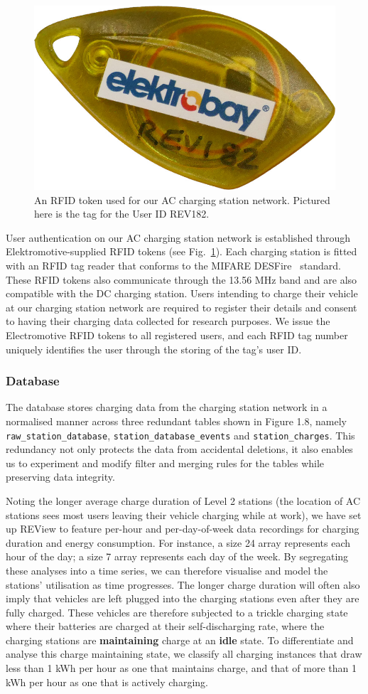 \begin{figure}[H]
	\centering
	\includegraphics[width=0.35\linewidth]{tag}
	\caption[An RFID token used for our AC charging station network]{An RFID token used for our AC charging station network. Pictured here is the tag for the User ID REV182.}
	\label{fig:9:actag}
\end{figure}

User authentication on our AC charging station network is established through Elektromotive-supplied RFID tokens (see Fig.~\ref{fig:9:actag}). Each charging station is fitted with an RFID tag reader that conforms to the MIFARE DESFire~\cite{nxp_semiconductors_mifare_nodate} standard. These RFID tokens also communicate through the 13.56 MHz band and are also compatible with the DC charging station. Users intending to charge their vehicle at our charging station network are required to register their details and consent to having their charging data collected for research purposes. We issue the Electromotive RFID tokens to all registered users, and each RFID tag number uniquely identifies the user through the storing of the tag’s user ID.

\subsubsection{Database}
The database stores charging data from the charging station network in a normalised manner across three redundant tables shown in Figure 1.8, namely \texttt{raw\_station\_database}, \texttt{station\_database\_events} and \texttt{station\_charges}. This redundancy not only protects the data from accidental deletions, it also enables us to experiment and modify filter and merging rules for the tables while preserving data integrity. 

Noting the longer average charge duration of Level 2 stations (the location of AC stations sees most users leaving their vehicle charging while at work), we have set up REView to feature per-hour and per-day-of-week data recordings for charging duration and energy consumption. For instance, a size 24 array represents each hour of the day; a size 7 array represents each day of the week. By segregating these analyses into a time series, we can therefore visualise and model the stations’ utilisation as time progresses. The longer charge duration will often also imply that vehicles are left plugged into the charging stations even after they are fully charged. These vehicles are therefore subjected to a trickle charging state where their batteries are charged at their self-discharging rate, where the charging stations are \textbf{maintaining} charge at an \textbf{idle} state. To differentiate and analyse this charge maintaining state, we classify all charging instances that draw less than 1 kWh per hour as one that maintains charge, and that of more than 1 kWh per hour as one that is actively charging. 

